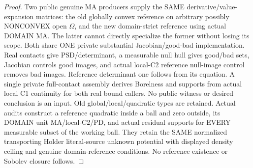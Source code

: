 \begin{proof}
  \leanok
  Two public genuine MA producers supply the SAME derivative/value-expansion
  matrices: the old globally convex reference on arbitrary possibly NONCONVEX
  open $\Omega$, and the new domain-strict reference using actual DOMAIN MA.
  The latter cannot directly specialize the former without losing its scope.
  Both share ONE private substantial Jacobian/good-bad implementation. Real
  contacts give PSD/determinant, a measurable null hull gives good/bad sets,
  Jacobian controls good images, and actual local-C2 reference null-image
  control removes bad images. Reference determinant one follows from its equation.
  A single private full-contact assembly derives Borelness and supports from
  actual local C1 continuity for both real bound callers. No public witness or
  desired conclusion is an input. Old global/local/quadratic types are retained.
  Actual audits construct a reference quadratic inside a ball and zero outside,
  its DOMAIN unit MA/local-C2/PD, and actual residual supports for EVERY measurable
  subset of the working ball. They retain the SAME normalized transporting Holder
  literal-source unknown potential with displayed density ceiling and genuine
  domain-reference conditions. No reference existence or Sobolev closure follows.
\end{proof}



